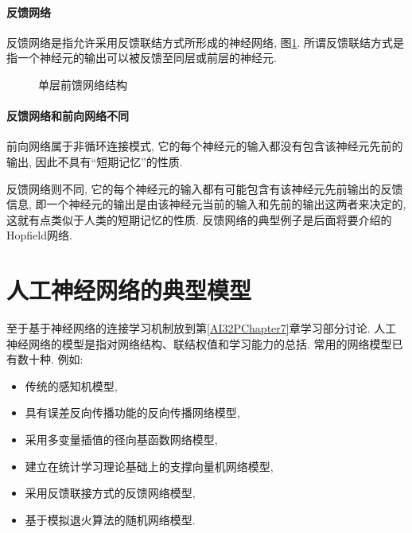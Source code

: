 \paragraph{反馈网络}
反馈网络是指允许采用反馈联结方式所形成的神经网络, 图\ref{AI32fig1202205}. 所谓反馈联结方式是指一个神经元的输出可以被反馈至同层或前层的神经元.
\begin{figure}[H]
\begin{center}
\caption{单层前馈网络结构}
\label{AI32fig1202205}
\end{center}
\end{figure}
\paragraph{反馈网络和前向网络不同}
前向网络属于非循环连接模式, 它的每个神经元的输入都没有包含该神经元先前的输出, 因此不具有“短期记忆”的性质.

反馈网络则不同, 它的每个神经元的输入都有可能包含有该神经元先前输出的反馈信息, 即一个神经元的输出是由该神经元当前的输入和先前的输出这两者来决定的, 这就有点类似于人类的短期记忆的性质.
反馈网络的典型例子是后面将要介绍的Hopfield网络.
\section{人工神经网络的典型模型}
至于基于神经网络的连接学习机制放到第\ref{AI32PChapter7}章学习部分讨论. 人工神经网络的模型是指对网络结构、联结权值和学习能力的总括. 常用的网络模型已有数十种. 例如:
\begin{itemize}
\item 传统的感知机模型,
\item 具有误差反向传播功能的反向传播网络模型,
\item 采用多变量插值的径向基函数网络模型,
\item 建立在统计学习理论基础上的支撑向量机网络模型,
\item 采用反馈联接方式的反馈网络模型,
\item 基于模拟退火算法的随机网络模型.
\end{itemize}
